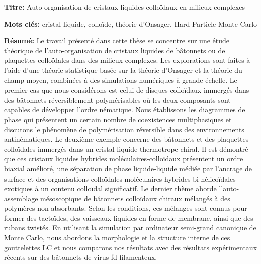 \documentclass[french,12pt,a4paper]{book}
\begin{document}
\small

\begin{mdframed}[linecolor=Prune,linewidth=1]

\textbf{Titre:} Auto-organisation de cristaux liquides colloïdaux en milieux complexes

\noindent \textbf{Mots clés:} cristal liquide, colloïde, théorie d'Onsager, Hard Particle Monte Carlo

\begin{multicols}{2}
\noindent \textbf{Résumé:} Le travail présenté dans cette thèse se concentre sur une étude théorique de l'auto-organisation de cristaux liquides de bâtonnets ou de plaquettes colloïdales dans des milieux complexes. Les explorations sont faites à l'aide d'une théorie statistique basée sur la théorie d'Onsager et la théorie du champ moyen, combinées à des simulations numériques à grande échelle. Le premier cas que nous considérons est celui de disques colloïdaux immergés dans des bâtonnets réversiblement polymérisables où les deux composants sont capables de développer l'ordre nématique. Nous établissons les diagrammes de phase qui présentent un certain nombre de coexistences multiphasiques et discutons le phénomène de polymérisation réversible dans des environnements antinématiques. Le deuxième exemple concerne des bâtonnets et des plaquettes colloïdales immergés dans un cristal liquide thermotrope chiral. Il est démontré que ces cristaux liquides hybrides moléculaires-colloïdaux présentent un ordre biaxial amélioré, une séparation de phase liquide-liquide médiée par l'ancrage de surface et des organisations colloïdales-moléculaires hybrides bi-hélicoïdales exotiques à un contenu colloïdal significatif. Le dernier thème aborde l'auto-assemblage mésoscopique de bâtonnets colloïdaux chiraux mélangés à des polymères non absorbants. Selon les conditions, ces mélanges sont connus pour former des tactoïdes, des vaisseaux liquides en forme de membrane, ainsi que des rubans twistés.  En utilisant la simulation par ordinateur semi-grand canonique de Monte Carlo, nous abordons la morphologie et la structure interne de ces gouttelettes LC et nous comparons nos résultats avec des résultats expérimentaux récents sur des bâtonnets de virus fd filamenteux.
\end{multicols}

\end{mdframed}

\vspace{8mm}
\end{document}
